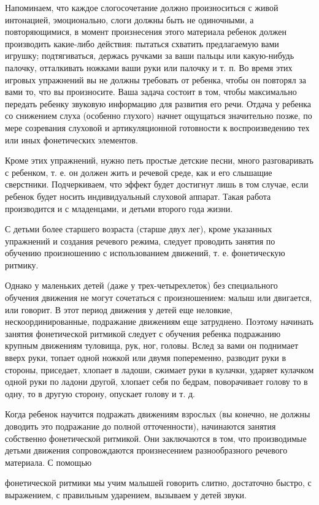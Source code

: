 \documentclass{book}
\begin{document}
Напоминаем, что каждое слогосочетание должно произноситься с живой
интонацией, эмоционально, слоги должны быть не одиночными, а
повторяющимися, в момент произнесения этого материала ребенок должен
производить какие-либо действия: пытаться схватить предлагаемую вами
игрушку; подтягиваться, держась ручками за ваши пальцы или какую-нибудь
палочку, отталкивать ножками ваши руки или палочку и т. п. Во время этих
игровых упражнений вы не должны требовать от ребенка, чтобы он повторял
за вами то, что вы произносите. Ваша задача состоит в том, чтобы
максимально передать ребенку звуковую информацию для развития его речи.
Отдача у ребенка со снижением слуха (особенно глухого) начнет ощущаться
значительно позже, по мере созревания слуховой и артикуляционной
готовности к воспроизведению тех или иных фонетических элементов.

Кроме этих упражнений, нужно петь простые детские песни, много
разговаривать с ребенком, т. е. он должен жить и речевой среде, как и
его слышащие сверстники. Подчеркиваем, что эффект будет достигнут лишь в
том случае, если ребенок будет носить индивидуальный слуховой аппарат.
Такая работа производится и с младенцами, и детьми второго года жизни.

С детьми более старшего возраста (старше двух лег), кроме указанных
упражнений и создания речевого режима, следует проводить занятия по
обучению произношению с использованием движений, т. е. фонетическую
ритмику.

Однако у маленьких детей (даже у трех-четырехлеток) без специального
обучения движения не могут сочетаться с произношением: малыш или
двигается, или говорит. В этот период движения у детей еще неловкие,
нескоординированные, подражание движениям еще затруднено. Поэтому
начинать занятия фонетической ритмикой следует с обучения ребенка
подражанию крупным движениям туловища, рук, ног, головы. Вслед за вами
он поднимает вверх руки, топает одной ножкой или двумя попеременно,
разводит руки в стороны, приседает, хлопает в ладоши, сжимает руки в
кулачки, ударяет кулачком одной руки по ладони другой, хлопает себя по
бедрам, поворачивает голову то в одну, то в другую сторону, опускает
голову и т. д.

Когда ребенок научится подражать движениям взрослых (вы конечно, не
должны доводить это подражание до полной отточенности), начинаются
занятия собственно фонетической ритмикой. Они заключаются в том, что
производимые детьми движения сопровождаются произнесением разнообразного
речевого материала. С помощью

фонетической ритмики мы учим малышей говорить слитно, достаточно быстро,
с выражением, с правильным ударением, вызываем у детей звуки.
\end{document}
